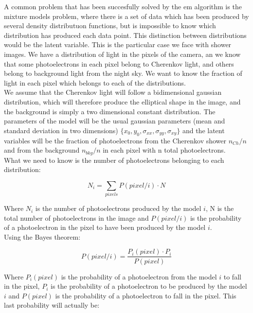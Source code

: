 \documentclass[main.tex]{subfiles}
\begin{document}
A common problem that has been succesfully solved by the \gls{em} algorithm is the mixture models problem, where there is a set of data which has been produced by several density distributuon functions, but is impossible to know which distribution has produced each data point. This distinction between distributions would be the latent variable. This is the particular case we face with shower images. We have a distribution of light in the pixels of the camera, an we know that some photoelectrons in each pixel belong to Cherenkov light, and others belong to background light from the night sky. We want to know the fraction of light in each pixel which belongs to each of the distributions.\\
We assume that the Cherenkov light will follow a bidimensional gaussian distribution, which will therefore produce the elliptical shape in the image, and the background is simply a two dimensional constant distribution. The parameters of the model will be the usual gaussian parameters (mean and standard deviation in two dimensions) $\{x_{0}, y_{0},\sigma_{xx}, \sigma_{yy}, \sigma_{xy}\}$ and the latent variables will be the fraction of photoelectrons from the Cherenkov shower $n_{Ch}/n$ and from the background $n_{bkg}/n$ in each pixel with n total photoelectrons.\\

What we need to know is the number of photoelectrons belonging to each distribution:

\begin{equation}
  N_{i} = \sum_{pixels} P(pixel/i)\cdot N
\end{equation}

Where $N_i$ is the number of photoelectrons produced by the model $i$, N is the total number of photoelectrons in the image and $P(pixel/i)$ is the probability of a photoelectron in the pixel to have been produced by the model $i$.\\
Using the Bayes theorem:

\begin{equation}\label{eq:bayes}
  P(pixel/i) = \frac{P_i(pixel) \cdot P_i}{P(pixel)}
\end{equation}

Where $P_i(pixel)$ is the probability of a photoelectron from the model $i$ to fall in the pixel, $P_i$ is the probability of a photoelectron to be produced by the model $i$ and $P(pixel)$ is the probability of a photoelectron to fall in the pixel. This last probability will actually be:
\end{document}
